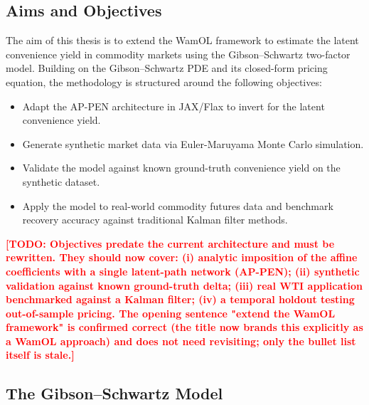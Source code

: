 \documentclass[11pt, a4paper]{article}
\newcommand{\todo}[1]{\textcolor{red}{\textbf{[TODO: #1]}}}
\begin{document}
\subsection{Aims and Objectives}
\label{sec:objectives}


The aim of this thesis is to extend the WamOL framework to estimate the latent convenience yield in commodity markets using the Gibson–Schwartz two-factor model. Building on the Gibson–Schwartz PDE and its closed-form pricing equation, the methodology is structured around the following objectives:

\begin{itemize}
    \item Adapt the AP-PEN architecture in JAX/Flax to invert for the latent convenience yield.
    \item Generate synthetic market data via Euler-Maruyama Monte Carlo simulation.
    \item Validate the model against known ground-truth convenience yield on the synthetic dataset.
    \item Apply the model to real-world commodity futures data and benchmark recovery accuracy against traditional Kalman filter methods.
\end{itemize}

\todo{Objectives predate the current architecture and must be rewritten. They
  should now cover: (i) analytic imposition of the affine coefficients with a
  single latent-path network (AP-PEN); (ii) synthetic validation against known
  ground-truth delta; (iii) real WTI application benchmarked against a Kalman
  filter; (iv) a temporal holdout testing out-of-sample pricing. The opening
  sentence "extend the WamOL framework" is confirmed correct (the title now
  brands this explicitly as a WamOL approach) and does not need revisiting;
  only the bullet list itself is stale.}

\subsection{The Gibson--Schwartz Model}
\label{sec:gs_model}
\end{document}
